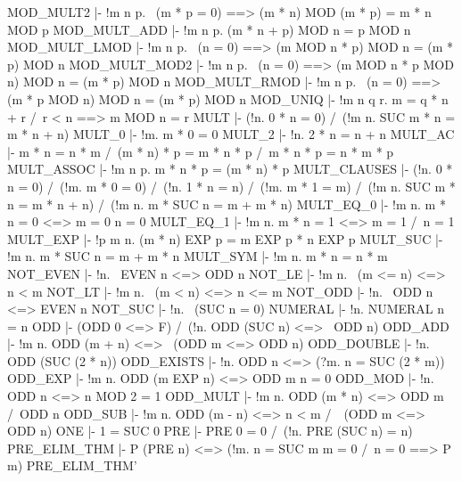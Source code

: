 \ENDTHEOREM
\THEOREM MOD\_MULT2
  |- !m n p. ~(m * p = 0) ==> (m * n) MOD (m * p) = m * n MOD p
\ENDTHEOREM
\THEOREM MOD\_MULT\_ADD
  |- !m n p. (m * n + p) MOD n = p MOD n
\ENDTHEOREM
\THEOREM MOD\_MULT\_LMOD
  |- !m n p. ~(n = 0) ==> (m MOD n * p) MOD n = (m * p) MOD n
\ENDTHEOREM
\THEOREM MOD\_MULT\_MOD2
  |- !m n p. ~(n = 0) ==> (m MOD n * p MOD n) MOD n = (m * p) MOD n
\ENDTHEOREM
\THEOREM MOD\_MULT\_RMOD
  |- !m n p. ~(n = 0) ==> (m * p MOD n) MOD n = (m * p) MOD n
\ENDTHEOREM
\THEOREM MOD\_UNIQ
  |- !m n q r. m = q * n + r /\ r < n ==> m MOD n = r
\ENDTHEOREM
\THEOREM MULT
  |- (!n. 0 * n = 0) /\ (!m n. SUC m * n = m * n + n)
\ENDTHEOREM
\THEOREM MULT\_0
  |- !m. m * 0 = 0
\ENDTHEOREM
\THEOREM MULT\_2
  |- !n. 2 * n = n + n
\ENDTHEOREM
\THEOREM MULT\_AC
  |- m * n = n * m /\ (m * n) * p = m * n * p /\ m * n * p = n * m * p
\ENDTHEOREM
\THEOREM MULT\_ASSOC
  |- !m n p. m * n * p = (m * n) * p
\ENDTHEOREM
\THEOREM MULT\_CLAUSES
  |- (!n. 0 * n = 0) /\
     (!m. m * 0 = 0) /\
     (!n. 1 * n = n) /\
     (!m. m * 1 = m) /\
     (!m n. SUC m * n = m * n + n) /\
     (!m n. m * SUC n = m + m * n)
\ENDTHEOREM
\THEOREM MULT\_EQ\_0
  |- !m n. m * n = 0 <=> m = 0 \/ n = 0
\ENDTHEOREM
\THEOREM MULT\_EQ\_1
  |- !m n. m * n = 1 <=> m = 1 /\ n = 1
\ENDTHEOREM
\THEOREM MULT\_EXP
  |- !p m n. (m * n) EXP p = m EXP p * n EXP p
\ENDTHEOREM
\THEOREM MULT\_SUC
  |- !m n. m * SUC n = m + m * n
\ENDTHEOREM
\THEOREM MULT\_SYM
  |- !m n. m * n = n * m
\ENDTHEOREM
\THEOREM NOT\_EVEN
  |- !n. ~EVEN n <=> ODD n
\ENDTHEOREM
\THEOREM NOT\_LE
  |- !m n. ~(m <= n) <=> n < m
\ENDTHEOREM
\THEOREM NOT\_LT
  |- !m n. ~(m < n) <=> n <= m
\ENDTHEOREM
\THEOREM NOT\_ODD
  |- !n. ~ODD n <=> EVEN n
\ENDTHEOREM
\THEOREM NOT\_SUC
  |- !n. ~(SUC n = 0)
\ENDTHEOREM
\THEOREM NUMERAL
  |- !n. NUMERAL n = n
\ENDTHEOREM
\THEOREM ODD
  |- (ODD 0 <=> F) /\ (!n. ODD (SUC n) <=> ~ODD n)
\ENDTHEOREM
\THEOREM ODD\_ADD
  |- !m n. ODD (m + n) <=> ~(ODD m <=> ODD n)
\ENDTHEOREM
\THEOREM ODD\_DOUBLE
  |- !n. ODD (SUC (2 * n))
\ENDTHEOREM
\THEOREM ODD\_EXISTS
  |- !n. ODD n <=> (?m. n = SUC (2 * m))
\ENDTHEOREM
\THEOREM ODD\_EXP
  |- !m n. ODD (m EXP n) <=> ODD m \/ n = 0
\ENDTHEOREM
\THEOREM ODD\_MOD
  |- !n. ODD n <=> n MOD 2 = 1
\ENDTHEOREM
\THEOREM ODD\_MULT
  |- !m n. ODD (m * n) <=> ODD m /\ ODD n
\ENDTHEOREM
\THEOREM ODD\_SUB
  |- !m n. ODD (m - n) <=> n < m /\ ~(ODD m <=> ODD n)
\ENDTHEOREM
\THEOREM ONE
  |- 1 = SUC 0
\ENDTHEOREM
\THEOREM PRE
  |- PRE 0 = 0 /\ (!n. PRE (SUC n) = n)
\ENDTHEOREM
\THEOREM PRE\_ELIM\_THM
  |- P (PRE n) <=> (!m. n = SUC m \/ m = 0 /\ n = 0 ==> P m)
\ENDTHEOREM
\THEOREM PRE\_ELIM\_THM'
